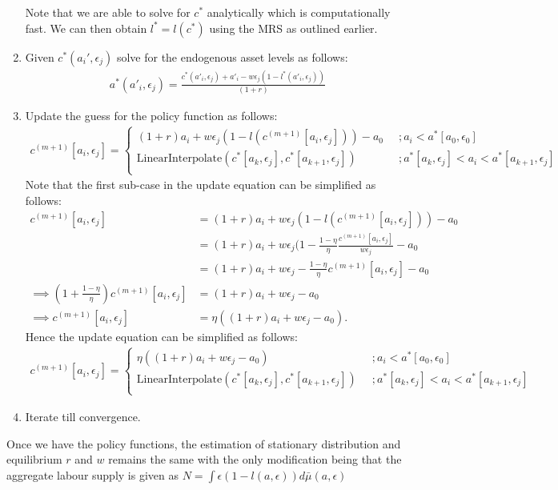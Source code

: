 \documentclass[12pt]{article}
\begin{document}
\begin{enumerate}
Note that we are able to solve for $c^*$ analytically which is computationally fast. We can then obtain $l^* = l(c^*)$ using the MRS as outlined earlier.
\item Given $c^*(a_i', \epsilon_j)$ solve for the endogenous asset levels as follows:
\begin{align*}
a^*(a'_i, \epsilon_j) = \frac{c^*(a'_i, \epsilon_j) + a'_i -w\epsilon_j(1-l^*(a'_i, \epsilon_j))}{(1+r)} 
\end{align*}
\item Update the guess for the policy function as follows:
\begin{align*}
c^{(m+1)}[a_i, \epsilon_j]= 
\begin{cases}
(1+r)a_i + w\epsilon_j(1-l(c^{(m+1)}[a_i, \epsilon_j])) - a_0 & \; \; ;  a_i < a^*[a_0, \epsilon_0] \\
\text{LinearInterpolate} (c^*[a_k, \epsilon_j], c^*[a_{k+1}, \epsilon_j])  & \; \; ; a^*[a_k, \epsilon_j] < a_i < a^*[a_{k+1}, \epsilon_j] \\
\end{cases}
\end{align*}
Note that the first sub-case in the update equation can be simplified as follows:
\begin{align*}
c^{(m+1)}[a_i, \epsilon_j] &=   (1+r)a_i + w\epsilon_j(1-l(c^{(m+1)}[a_i, \epsilon_j])) - a_0 \\
& = (1+r)a_i + w\epsilon_j(1-\frac{1-\eta}{\eta}\frac{c^{(m+1)}[a_i, \epsilon_j]}{w\epsilon_j } - a_0 \\
& = (1+r)a_i + w\epsilon_j - \frac{1-\eta}{\eta}c^{(m+1)}[a_i, \epsilon_j] - a_0\\
\implies  (1+\frac{1-\eta}{\eta})c^{(m+1)}[a_i, \epsilon_j] & = (1+r)a_i + w\epsilon_j -a_0 \\
\implies  c^{(m+1)}[a_i, \epsilon_j] & = \eta((1+r)a_i + w\epsilon_j -a_0).
\end{align*} 
Hence the update equation can be simplified as follows:
\begin{align*}
c^{(m+1)}[a_i, \epsilon_j]= 
\begin{cases}
\eta((1+r)a_i + w\epsilon_j -a_0) & \; \; ;  a_i < a^*[a_0, \epsilon_0] \\
\text{LinearInterpolate} (c^*[a_k, \epsilon_j], c^*[a_{k+1}, \epsilon_j])  & \; \; ; a^*[a_k, \epsilon_j] < a_i < a^*[a_{k+1}, \epsilon_j] \\
\end{cases}
\end{align*}
\item Iterate till convergence.
\end{enumerate}
Once we have the policy functions, the estimation of stationary distribution and equilibrium $r$ and $w$ remains the same with the only modification being that the aggregate labour supply is given as $N = \int \epsilon(1-l(a, \epsilon)) d\bar{\mu}(a, \epsilon)$ 
\end{document}
